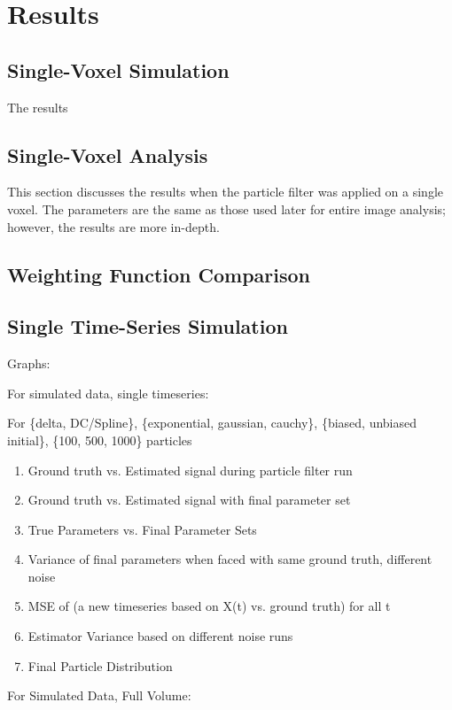 \chapter{Results}
\section{Single-Voxel Simulation}
The results 

\section{Single-Voxel Analysis}
This section discusses the results when the particle filter was
applied on a single voxel. The parameters are the same as
those used later for entire image analysis; however, the results
are more in-depth. 

\section{Weighting Function Comparison}
\label{sec:Results Weights}

\section{Single Time-Series Simulation}

Graphs: 

For simulated data, single timeseries:

For \{delta, DC/Spline\}, \{exponential, gaussian, cauchy\}, \{biased, unbiased initial\},
\{100, 500, 1000\} particles
\begin{enumerate}
\item Ground truth vs. Estimated signal during particle filter run
\item Ground truth vs. Estimated signal with final parameter set
\item True Parameters vs. Final Parameter Sets
\item Variance of final parameters when faced with same ground truth, different noise
\item MSE of (a new timeseries based on X(t) vs. ground truth) for all t
\item Estimator Variance based on different noise runs
\item Final Particle Distribution
\end{enumerate}

For Simulated Data, Full Volume:

